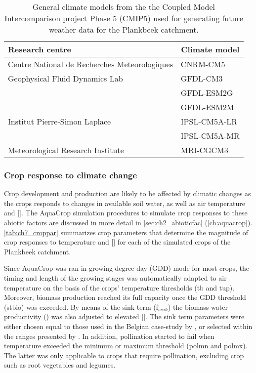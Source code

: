 \begin{table}[htbp]
  \centering
  	\caption{General climate models from the the Coupled Model Intercomparison project Phase 5 (CMIP5) used for generating future weather data for the Plankbeek catchment.}
\begin{tabular}{lc}
\toprule
\textbf{Research centre} & \textbf{Climate model } \\
\midrule
\multicolumn{1}{l}{Centre National de Recherches Meteorologiques} & \multicolumn{1}{l}{CNRM-CM5} \\
\multicolumn{1}{l}{Geophysical Fluid Dynamics Lab} & \multicolumn{1}{l}{GFDL-CM3} \\
\multicolumn{1}{l}{} & \multicolumn{1}{l}{GFDL-ESM2G} \\
\multicolumn{1}{l}{} & \multicolumn{1}{l}{GFDL-ESM2M} \\
\multicolumn{1}{l}{Institut Pierre-Simon Laplace} & \multicolumn{1}{l}{IPSL-CM5A-LR} \\
\multicolumn{1}{l}{} & \multicolumn{1}{l}{IPSL-CM5A-MR} \\
\multicolumn{1}{l}{Meteorological Research Institute} & \multicolumn{1}{l}{MRI-CGCM3} \\
\bottomrule
\end{tabular}%
  \label{tab:ch7_GCMs}%
  \end{table}


\subsubsection{Crop response to climate change}
Crop development and production are likely to be affected by climatic changes as the crops responds to changes in available soil water, as well as air temperature and [\COtwo]. The AquaCrop simulation procedures to simulate crop responses to these abiotic factors are discussed in more detail in \autoref{sec:ch2_abioticfac} (\autoref{ch:aquacrop}). \autoref{tab:ch7_croppar} summarizes crop parameters that determine the magnitude of crop responses to temperature and [\COtwo]  for each of the simulated crops of the Plankbeek catchment. 

Since AquaCrop was ran in growing degree day (GDD) mode for most crops, the timing and length of the growing stages was automatically adapted to air temperature on the basis of the crops' temperature thresholds (tb and tup).  Moreover, biomass production reached its full capacity once the GDD threshold (stbio) was exceeded. By means of  the sink term (f$_{sink}$) the biomass water productivity (\WPster) was also adjusted to elevated [\COtwo]. The sink term parameters were either chosen equal to those used in the Belgian case-study by \textcite{vanuytrecht2015},  or selected within the ranges presented by \textcite{vanuytrecht2011}. In addition, pollination started to fail when temperature exceeded the minimum or maximum threshold (polmn and polmx). The latter was only applicable to crops that require pollination, excluding crop such as root vegetables and legumes.

